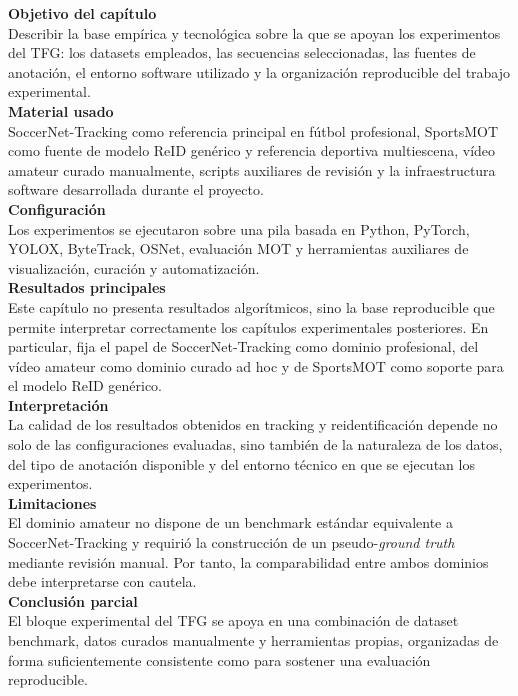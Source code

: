\documentclass[../MAIN.tex]{subfiles}
\begin{document}
	\begin{chaptertemplatebox}
		\textbf{Objetivo del capítulo}\\
		Describir la base empírica y tecnológica sobre la que se apoyan los experimentos del TFG: los datasets empleados, las secuencias seleccionadas, las fuentes de anotación, el entorno software utilizado y la organización reproducible del trabajo experimental.\\[0.5em]
		
		\textbf{Material usado}\\
		SoccerNet-Tracking como referencia principal en fútbol profesional, SportsMOT como fuente de modelo ReID genérico y referencia deportiva multiescena, vídeo amateur curado manualmente, scripts auxiliares de revisión y la infraestructura software desarrollada durante el proyecto.\\[0.5em]
		
		\textbf{Configuración}\\
		Los experimentos se ejecutaron sobre una pila basada en Python, PyTorch, YOLOX, ByteTrack, OSNet, evaluación MOT y herramientas auxiliares de visualización, curación y automatización.\\[0.5em]
		
		\textbf{Resultados principales}\\
		Este capítulo no presenta resultados algorítmicos, sino la base reproducible que permite interpretar correctamente los capítulos experimentales posteriores. En particular, fija el papel de SoccerNet-Tracking como dominio profesional, del vídeo amateur como dominio curado ad hoc y de SportsMOT como soporte para el modelo ReID genérico.\\[0.5em]
		
		\textbf{Interpretación}\\
		La calidad de los resultados obtenidos en tracking y reidentificación depende no solo de las configuraciones evaluadas, sino también de la naturaleza de los datos, del tipo de anotación disponible y del entorno técnico en que se ejecutan los experimentos.\\[0.5em]
		
		\textbf{Limitaciones}\\
		El dominio amateur no dispone de un benchmark estándar equivalente a SoccerNet-Tracking y requirió la construcción de un pseudo-\textit{ground truth} mediante revisión manual. Por tanto, la comparabilidad entre ambos dominios debe interpretarse con cautela.\\[0.5em]
		
		\textbf{Conclusión parcial}\\
		El bloque experimental del TFG se apoya en una combinación de dataset benchmark, datos curados manualmente y herramientas propias, organizadas de forma suficientemente consistente como para sostener una evaluación reproducible.
	\end{chaptertemplatebox}
	
\end{document}
